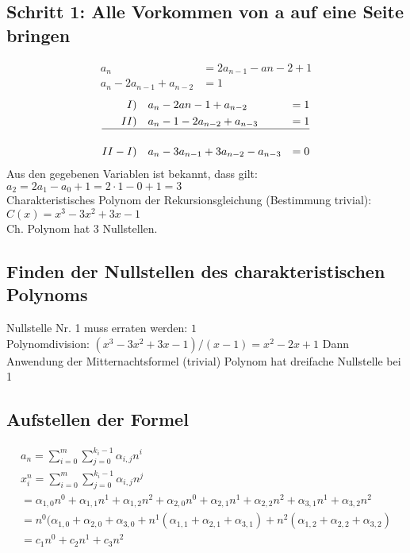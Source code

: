 \documentclass[a4paper,10pt,freqn]{article}
\begin{document}
\subsection{Schritt 1: Alle Vorkommen von a auf eine Seite bringen}
\begin{align*}
a_n &= 2a_{n-1}-a{n-2}+1 \\
a_n-2a_{n-1}+a_{n-2}&=1
\end{align*}
\begin{align*}
I)\quad&a_n-2a{n-1}+a_{n-2}&=1\\
II)\quad&a_n-1-2a_{n-2}+a_{n-3}&=1\\
\hline\\
II-I)\quad&a_n-3a_{n-1}+3a_{n-2}-a_{n-3}&=0\label{(1)-(2)}
\end{align*}
Aus den gegebenen Variablen ist bekannt, dass gilt:\\$a_2 = 2a_1-a_0+1 = 2\cdot1-0+1=3$\\

Charakteristisches Polynom der Rekursionsgleichung (Bestimmung trivial):\\
$C(x) = x^3-3x^2+3x-1$\\
\textrightarrow Ch. Polynom hat 3 Nullstellen.
\subsection{Finden der Nullstellen des charakteristischen Polynoms}
Nullstelle Nr. 1 muss erraten werden: $1$\\
Polynomdivision: $(x^3-3x^2+3x-1)/(x-1)=x^2-2x+1$
Dann Anwendung der Mitternachtsformel (trivial) \textrightarrow Polynom hat dreifache Nullstelle bei 1
\subsection{Aufstellen der Formel}
\begin{eqnarray*}
 a_n = \sum_{i=0}^m\sum_{j=0}^{k_i-1} \alpha_{i,j}n^i\\
 x_i^n  =\sum_{i=0}^m\sum_{j=0}^{k_i-1} \alpha_{i,j}n^j\\
 =\alpha_{1,0}n^0+\alpha_{1,1}n^1+\alpha_{1,2}n^2+\alpha_{2,0}n^0+\alpha_{2,1}n^1+\alpha_{2,2}n^2+\alpha_{3,1}n^1+\alpha_{3,2}n^2\\=
 n^0(\alpha_{1,0}+\alpha_{2,0}+\alpha_{3,0}+n^1(\alpha_{1,1}+\alpha_{2,1}+\alpha_{3,1})+n^2(\alpha_{1,2}+\alpha_{2,2}+\alpha_{3,2})\\=
 c_1n^0+c_2n^1+c_3n^2
\end{eqnarray*}
\end{document}
